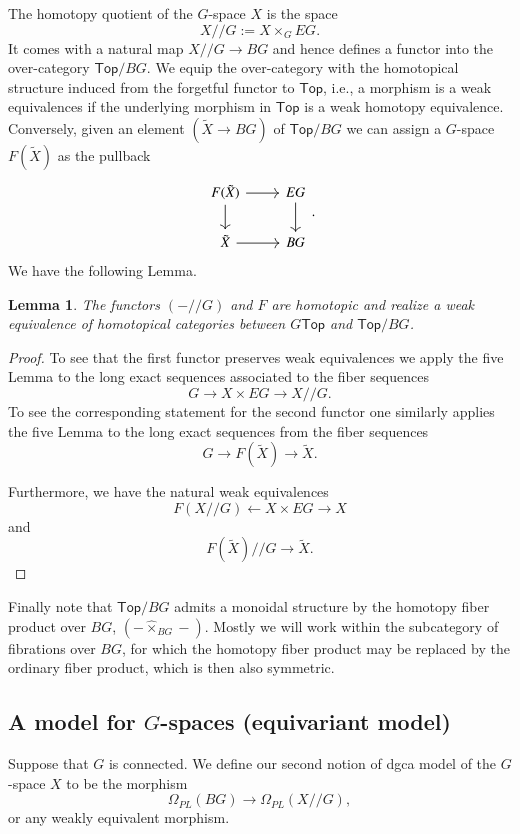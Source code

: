 \documentclass[a4paper]{amsart}
\theoremstyle{plain}
\newtheorem{lemma}[thm]{Lemma}
\theoremstyle{definition}
\newcommand{\dgca}{\mathsf{Dgca}}
\renewcommand{\Top}{\mathsf{Top}}
\begin{document}
The homotopy quotient of the $G$-space $X$ is the space
\[
 X//G := X\times_G EG.
\]
It comes with a natural map $X//G\to BG$ and hence defines a functor into the over-category $\Top/BG$.
We equip the over-category with the homotopical structure induced from the forgetful functor to $\Top$, i.e., a morphism is a weak equivalences if the underlying morphism in $\Top$ is a weak homotopy equivalence.
Conversely, given an element $(\tilde X\to BG)$ of $\Top/BG$ we can assign a $G$-space $F(\tilde X)$ as the pullback
\[
 \begin{tikzcd}
  F(\tilde X) \ar{r}\ar{d} & EG \ar{d} \\
  \tilde X \ar{r} & BG 
 \end{tikzcd}.
\]
We have the following Lemma.
\begin{lemma}
 The functors $(-//G)$ and $F$ are homotopic and realize a weak equivalence of homotopical categories between $G\Top$ and $\Top/BG$.
\end{lemma}
\begin{proof}
To see that the first functor preserves weak equivalences we apply the five Lemma to the long exact sequences associated to the fiber sequences
\[
 G \to X\times EG \to X//G.
\]
To see the corresponding statement for the second functor one similarly applies the five Lemma to the long exact sequences from the fiber sequences
\[
 G\to F(\tilde X) \to \tilde X.
\]

Furthermore, we have the natural weak equivalences
\[
 F(X//G) \leftarrow X\times EG \rightarrow X
\]
and 
\[
 F(\tilde X) // G \to \tilde X.
\]
\end{proof}

Finally note that $\Top/BG$ admits a monoidal structure by the homotopy fiber product over $BG$, $(-\hat \times_{BG}-)$.
Mostly we will work within the subcategory of fibrations over $BG$, for which the homotopy fiber product may be replaced by the ordinary fiber product, which is then also symmetric.


\subsection{A model for \texorpdfstring{$G$}{G}-spaces (equivariant model)}
\label{sec:Gspacemodels}
Suppose that $G$ is connected.
We define our second notion of dgca model of the $G$-space $X$ to be the morphism 
\[
 \Omega_{PL}(BG) \to \Omega_{PL}(X//G),
\]
or any weakly equivalent morphism.
\end{document}
